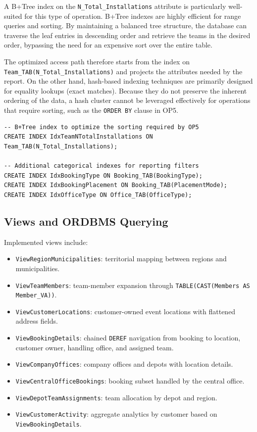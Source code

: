 \documentclass[12pt,a4paper]{article}
\begin{document}
A B+Tree index on the \texttt{N\_Total\_Installations} attribute is particularly well-suited for this type of operation. B+Tree indexes are highly efficient for range queries and sorting. By maintaining a balanced tree structure, the database can traverse the leaf entries in descending order and retrieve the teams in the desired order, bypassing the need for an expensive sort over the entire table.

The optimized access path therefore starts from the index on \texttt{Team\_TAB(N\_Total\_Installations)} and projects the attributes needed by the report. On the other hand, hash-based indexing techniques are primarily designed for equality lookups (exact matches). Because they do not preserve the inherent ordering of the data, a hash cluster cannot be leveraged effectively for operations that require sorting, such as the \texttt{ORDER BY} clause in OP5.

\begin{verbatim}
-- B+Tree index to optimize the sorting required by OP5
CREATE INDEX IdxTeamNTotalInstallations ON Team_TAB(N_Total_Installations);

-- Additional categorical indexes for reporting filters
CREATE INDEX IdxBookingType ON Booking_TAB(BookingType);
CREATE INDEX IdxBookingPlacement ON Booking_TAB(PlacementMode);
CREATE INDEX IdxOfficeType ON Office_TAB(OfficeType);
\end{verbatim}
\subsection{Views and ORDBMS Querying}
Implemented views include:
\begin{itemize}
    \item \texttt{ViewRegionMunicipalities}: territorial mapping between regions and municipalities.
    \item \texttt{ViewTeamMembers}: team-member expansion through \texttt{TABLE(CAST(Members AS Member\_VA))}.
    \item \texttt{ViewCustomerLocations}: customer-owned event locations with flattened address fields.
    \item \texttt{ViewBookingDetails}: chained \texttt{DEREF} navigation from booking to location, customer owner, handling office, and assigned team.
    \item \texttt{ViewCompanyOffices}: company offices and depots with location details.
    \item \texttt{ViewCentralOfficeBookings}: booking subset handled by the central office.
    \item \texttt{ViewDepotTeamAssignments}: team allocation by depot and region.
    \item \texttt{ViewCustomerActivity}: aggregate analytics by customer based on \texttt{ViewBookingDetails}.
\end{itemize}
\end{document}
